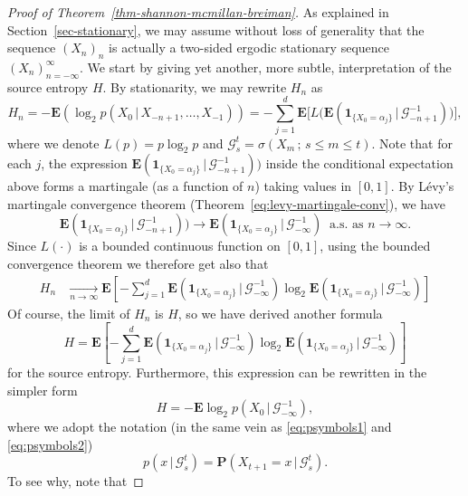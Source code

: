 \documentclass[12pt]{article}
\newcommand{\prob}{\mathbf{P}}
\newcommand{\expec}{\mathbf{E}}
\newcommand{\condexp}[2]{\expec\left(#1\,|\,#2\right)}
\newcommand{\condprob}[2]{\prob\left(#1\,|\,#2\right)}
\newcommand{\ind}{\textbf{1}}
\theoremstyle{example}
\begin{document}
\begin{proof}[Proof of Theorem~\ref{thm-shannon-mcmillan-breiman}] As explained in Section~\ref{sec-stationary}, we may assume without loss of generality that the sequence $(X_n)_n$ is actually a two-sided ergodic stationary sequence $(X_n)_{n=-\infty}^\infty$. We start by giving yet another, more subtle, interpretation of the source entropy $H$. By stationarity, we may rewrite $H_n$ as
$$ H_n = -\expec(\log_2 p(X_0\,|\,X_{-n+1},\ldots,X_{-1})) = -\sum_{j=1}^d \expec\Big[ L\big(
\condexp{\ind_{\{X_0=\alpha_j\}}}{\mathcal{G}_{-n+1}^{-1}} \big)\Big], 
$$
where we denote $L(p) = p\log_2 p$ and $\mathcal{G}_s^t = \sigma(X_m\,;\, s\le m\le t)$. Note that for each $j$, the expression $\condexp{\ind_{\{X_0=\alpha_j\}}}{\mathcal{G}_{-n+1}^{-1}} \big)$ inside the conditional expectation above forms a martingale (as a function of $n$) taking values in $[0,1]$. By L\'evy's martingale convergence theorem (Theorem~\ref{eq:levy-martingale-conv}), we have
$$ \condexp{\ind_{\{X_0=\alpha_j\}}}{\mathcal{G}_{-n+1}^{-1}} \big) \to \condexp{\ind_{\{X_0=\alpha_j\}}}{\mathcal{G}_{-\infty}^{-1}} \ \textrm{ a.s. as }n\to\infty.
$$
Since $L(\cdot)$ is a bounded continuous function on $[0,1]$, using the bounded convergence theorem we therefore get also that 
\begin{align*} H_n 
&\xrightarrow[n\to\infty]{} \expec\left[ -\sum_{j=1}^d \condexp{\ind_{\{X_0=\alpha_j\}}}{\mathcal{G}_{-\infty}^{-1}}
\log_2 \condexp{\ind_{\{X_0=\alpha_j\}}}{\mathcal{G}_{-\infty}^{-1}}
\right] 
\end{align*}
Of course, the limit of $H_n$ is $H$, so we have derived another formula
\begin{equation} \label{eq:entropy-newformula}
H = \expec\left[ -\sum_{j=1}^d \condexp{\ind_{\{X_0=\alpha_j\}}}{\mathcal{G}_{-\infty}^{-1}}
\log_2 \condexp{\ind_{\{X_0=\alpha_j\}}}{\mathcal{G}_{-\infty}^{-1}}
\right] 
\end{equation}
for the source entropy. Furthermore, this expression can be rewritten in the simpler form
\begin{equation} \label{eq:entropy-simpler}
H = -\expec \log_2 p(X_0\,|\,\mathcal{G}_{-\infty}^{-1}),
\end{equation}
where we adopt the notation (in the same vein as \eqref{eq:psymbols1} and \eqref{eq:psymbols2})
\begin{equation} \label{eq:psymbols-generalized}
p(x\,|\,\mathcal{G}_s^t) = \condprob{X_{t+1}=x}{\mathcal{G}_s^t}.
\end{equation}
To see why, note that

\end{proof}
\end{document}
